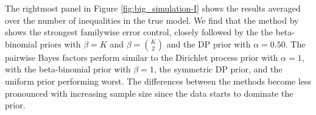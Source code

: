 \documentclass[11pt,a4paper]{article}
\theoremstyle{definition} %
\theoremstyle{case}
\newcommand{\FD}[1]{\textcolor{red}{Fabian: #1 }}
\begin{document}



The rightmost panel in Figure \ref{fig:big_simulation-I} shows the results averaged over the number of inequalities in the true model. We find that the method by \textcite{westfall1997bayesian} shows the strongest familywise error control, closely followed by the the beta-binomial priors with $\beta = K$ and $\beta = {K \choose 2}$ and the DP prior with $\alpha = 0.50$. The pairwise Bayes factors perform similar to the Dirichlet process prior with $\alpha = 1$, with the beta-binomial prior with $\beta = 1$, the symmetric DP prior, and the uniform prior performing worst. The differences between the methods become less pronounced with increasing sample size since the data starts to dominate the prior.

\end{document}
